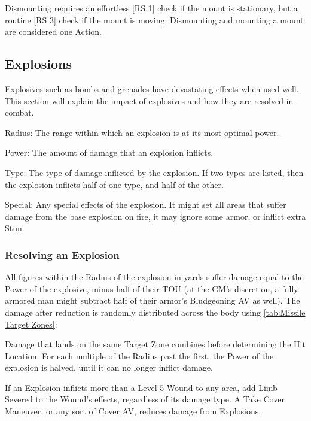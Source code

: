 \documentclass[oneside,11pt,english]{book}
\begin{document}
Dismounting requires an effortless [RS 1] check if the mount is stationary, but a routine [RS 3] check if the mount is moving. Dismounting and mounting a mount are considered one Action.

\subsection{Explosions}\label{sec:Explosions}
Explosives such as bombs and grenades have devastating effects when used well. This section will explain the impact of explosives and how they are resolved in combat.
	\begin{description}
		\item Radius: The range within which an explosion is at its most optimal power.
		\item Power: The amount of damage that an explosion inflicts.
		\item Type: The type of damage inflicted by the explosion. If two types are listed, then the explosion inflicts half of one type, and half of the other.
		\item Special: Any special effects of the explosion. It might set all areas that suffer damage from the base explosion on fire, it may ignore some armor, or inflict extra Stun.
	\end{description}

\subsubsection{Resolving an Explosion}
All figures within the Radius of the explosion in yards suffer damage equal to the Power of the explosive, minus half of their TOU (at the GM's discretion, a fully-armored man might subtract half of their armor's Bludgeoning AV as well). The damage after reduction is randomly distributed across the body using \autoref{tab:Missile Target Zones}:~ 

Damage that lands on the same Target Zone combines before determining the Hit Location.
For each multiple of the Radius past the first, the Power of the explosion is halved, until it can no longer inflict damage. 

If an Explosion inflicts more than a Level 5 Wound to any area, add Limb Severed to the Wound's effects, regardless of its damage type.
A Take Cover Maneuver, or any sort of Cover AV, reduces damage from Explosions.
\end{document}
